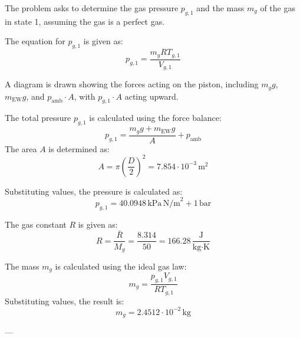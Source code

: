The problem asks to determine the gas pressure \( p_{g,1} \) and the mass \( m_g \) of the gas in state 1, assuming the gas is a perfect gas.  

The equation for \( p_{g,1} \) is given as:  
\[
p_{g,1} = \frac{m_g R T_{g,1}}{V_{g,1}}
\]  

A diagram is drawn showing the forces acting on the piston, including \( m_g g \), \( m_{\text{EW}} g \), and \( p_{\text{amb}} \cdot A \), with \( p_{g,1} \cdot A \) acting upward.  

The total pressure \( p_{g,1} \) is calculated using the force balance:  
\[
p_{g,1} = \frac{m_g g + m_{\text{EW}} g}{A} + p_{\text{amb}}
\]  
The area \( A \) is determined as:  
\[
A = \pi \left(\frac{D}{2}\right)^2 = 7.854 \cdot 10^{-3} \, \text{m}^2
\]  

Substituting values, the pressure is calculated as:  
\[
p_{g,1} = 40.0948 \, \text{kPa} \, \text{N/m}^2 + 1 \, \text{bar}
\]  

The gas constant \( R \) is given as:  
\[
R = \frac{\bar{R}}{M_g} = \frac{8.314}{50} = 166.28 \, \frac{\text{J}}{\text{kg·K}}
\]  

The mass \( m_g \) is calculated using the ideal gas law:  
\[
m_g = \frac{p_{g,1} V_{g,1}}{R T_{g,1}}
\]  
Substituting values, the result is:  
\[
m_g = 2.4512 \cdot 10^{-2} \, \text{kg}
\]  

---
